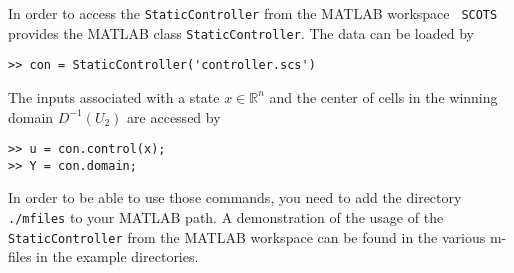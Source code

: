 \documentclass[a4paper]{amsart}
\newcommand{\R}{\mathbb{R}}
\begin{document}
In order to access the {\tt StaticController} from the MATLAB workspace {\tt
SCOTS} provides the MATLAB class {\tt StaticController}. The data can be loaded
by
\begin{lstlisting}[basicstyle=\small\ttfamily]
>> con = StaticController('controller.scs')
\end{lstlisting}
The inputs associated with a state $x\in \R^n$ and the center of cells in the
winning domain $D^{-1}(U_2)$ are accessed by
\begin{lstlisting}[basicstyle=\small\ttfamily]
>> u = con.control(x);
>> Y = con.domain;
\end{lstlisting}
In order to be able to use those commands, you need to add the directory {\tt
./mfiles} to your MATLAB path.
A demonstration of the usage of the {\tt StaticController} from the MATLAB
workspace can be found in the various m-files in the example directories.


%
%
%
%
%

%

%
%




\newpage

\printbibliography
\end{document}

